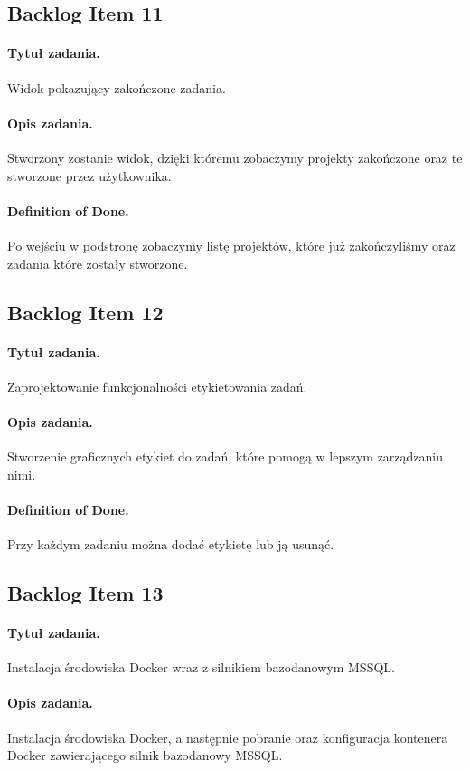 \documentclass[a4paper]{article}
\begin{document}
\subsection{Backlog Item 11} 
\paragraph{Tytuł zadania.} Widok pokazujący zakończone zadania.
\paragraph{Opis zadania.} Stworzony zostanie widok, dzięki któremu zobaczymy projekty zakończone oraz te stworzone przez użytkownika.
\paragraph{Definition of Done.} Po wejściu w podstronę zobaczymy listę projektów, które już zakończyliśmy oraz zadania które zostały stworzone.

\subsection{Backlog Item 12} 
\paragraph{Tytuł zadania.} Zaprojektowanie funkcjonalności etykietowania zadań.
\paragraph{Opis zadania.} Stworzenie graficznych etykiet do zadań, które pomogą w lepszym zarządzaniu nimi.
\paragraph{Definition of Done.} Przy każdym zadaniu można dodać etykietę lub ją usunąć.



\subsection{Backlog Item 13} 
\paragraph{Tytuł zadania.}  Instalacja środowiska Docker wraz z silnikiem bazodanowym MSSQL.
\paragraph{Opis zadania.} Instalacja środowiska Docker, a następnie pobranie oraz konfiguracja kontenera Docker zawierającego silnik bazodanowy MSSQL.
\end{document}
